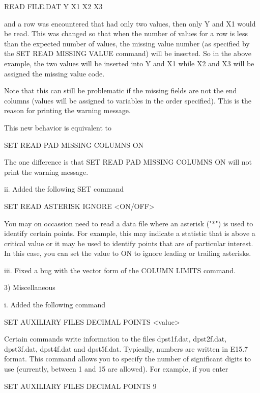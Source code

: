              READ FILE.DAT Y X1 X2 X3

         and a row was encountered that had only two values, then only
         Y and X1 would be read.  This was changed so that when the number
         of values for a row is less than the expected number of values,
         the missing value number (as specified by the SET READ MISSING
         VALUE command) will be inserted.  So in the above example, the
         two values will be inserted into Y and X1 while X2 and X3 will be
         assigned the missing value code.

         Note that this can still be problematic if the missing fields are
         not the end columns (values will be assigned to variables in the
         order specified).  This is the reason for printing the warning
         message.

         This new behavior is equivalent to

              SET READ PAD MISSING COLUMNS ON

         The one difference is that SET READ PAD MISSING COLUMNS ON will
         not print the warning message.

     ii. Added the following SET command

            SET READ ASTERISK IGNORE <ON/OFF>

         You may on occassion need to read a data file where an asterisk
         ("*") is used to identify certain points.  For example, this may
         indicate a statistic that is above a critical value or it may
         be used to identify points that are of particular interest.  In
         this case, you can set the value to ON to ignore leading or
         trailing asterisks.

    iii. Fixed a bug with the vector form of the COLUMN LIMITS command.

 3) Miscellaneous

      i. Added the following command

           SET AUXILIARY FILES DECIMAL POINTS <value>

         Certain commands write information to the files dpst1f.dat,
         dpst2f.dat, dpst3f.dat, dpst4f.dat and dpst5f.dat.  Typically,
         numbers are written in E15.7 format.  This command allows you to
         specify the number of significant digits to use (currently,
         between 1 and 15 are allowed).  For example, if you enter

           SET AUXILIARY FILES DECIMAL POINTS 9

